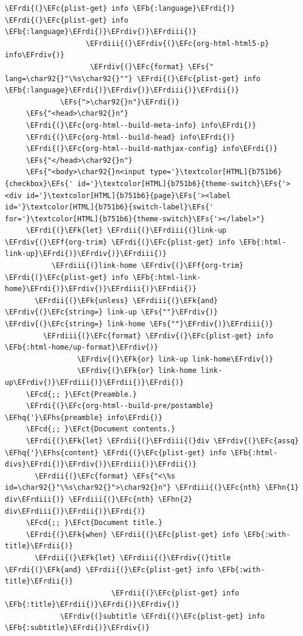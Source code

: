 \documentclass{scrartcl}
\newcommand{\EFk}[1]{\textcolor{EFk}{#1}} %
\newcommand{\EFs}[1]{\textcolor{EFs}{#1}} %
\newcommand{\EFb}[1]{\textcolor{EFb}{#1}} %
\newcommand{\EFct}[1]{\textcolor{EFct}{#1}} %
\newcommand{\EFc}[1]{\textcolor{EFc}{#1}} %
\newcommand{\EFf}[1]{\textcolor{EFf}{#1}} %
\newcommand{\EFcd}[1]{\textcolor{EFcd}{#1}} %
\newcommand{\EFhn}[1]{\textcolor{EFhn}{\textbf{#1}}} %
\newcommand{\EFhq}[1]{\textcolor{EFhq}{#1}} %
\newcommand{\EFhs}[1]{\textcolor{EFhs}{#1}} %
\newcommand{\EFrdi}[1]{\textcolor{EFrdi}{#1}} %
\newcommand{\EFrdii}[1]{\textcolor{EFrdii}{#1}} %
\newcommand{\EFrdiii}[1]{\textcolor{EFrdiii}{#1}} %
\newcommand{\EFrdiv}[1]{\textcolor{EFrdiv}{#1}} %
\begin{document}
\begin{Code}
\begin{Verbatim}[]
                     \EFrdi{(}\EFc{plist-get} info \EFb{:language}\EFrdi{)} \EFrdi{(}\EFc{plist-get} info \EFb{:language}\EFrdi{)}\EFrdiv{)}\EFrdiii{)}
                   \EFrdiii{(}\EFrdiv{(}\EFc{org-html-html5-p} info\EFrdiv{)}
                    \EFrdiv{(}\EFc{format} \EFs{" lang=\char92{}"\%s\char92{}""} \EFrdi{(}\EFc{plist-get} info \EFb{:language}\EFrdi{)}\EFrdiv{)}\EFrdiii{)}\EFrdii{)}
             \EFs{">\char92{}n"}\EFrdi{)}
     \EFs{"<head>\char92{}n"}
     \EFrdi{(}\EFc{org-html--build-meta-info} info\EFrdi{)}
     \EFrdi{(}\EFc{org-html--build-head} info\EFrdi{)}
     \EFrdi{(}\EFc{org-html--build-mathjax-config} info\EFrdi{)}
     \EFs{"</head>\char92{}n"}
     \EFs{"<body>\char92{}n<input type='}\textcolor[HTML]{b751b6}{checkbox}\EFs{' id='}\textcolor[HTML]{b751b6}{theme-switch}\EFs{'><div id='}\textcolor[HTML]{b751b6}{page}\EFs{'><label id='}\textcolor[HTML]{b751b6}{switch-label}\EFs{' for='}\textcolor[HTML]{b751b6}{theme-switch}\EFs{'></label>"}
     \EFrdi{(}\EFk{let} \EFrdii{(}\EFrdiii{(}link-up \EFrdiv{(}\EFf{org-trim} \EFrdi{(}\EFc{plist-get} info \EFb{:html-link-up}\EFrdi{)}\EFrdiv{)}\EFrdiii{)}
           \EFrdiii{(}link-home \EFrdiv{(}\EFf{org-trim} \EFrdi{(}\EFc{plist-get} info \EFb{:html-link-home}\EFrdi{)}\EFrdiv{)}\EFrdiii{)}\EFrdii{)}
       \EFrdii{(}\EFk{unless} \EFrdiii{(}\EFk{and} \EFrdiv{(}\EFc{string=} link-up \EFs{""}\EFrdiv{)} \EFrdiv{(}\EFc{string=} link-home \EFs{""}\EFrdiv{)}\EFrdiii{)}
         \EFrdiii{(}\EFc{format} \EFrdiv{(}\EFc{plist-get} info \EFb{:html-home/up-format}\EFrdiv{)}
                 \EFrdiv{(}\EFk{or} link-up link-home\EFrdiv{)}
                 \EFrdiv{(}\EFk{or} link-home link-up\EFrdiv{)}\EFrdiii{)}\EFrdii{)}\EFrdi{)}
     \EFcd{;; }\EFct{Preamble.}
     \EFrdi{(}\EFc{org-html--build-pre/postamble} \EFhq{'}\EFhs{preamble} info\EFrdi{)}
     \EFcd{;; }\EFct{Document contents.}
     \EFrdi{(}\EFk{let} \EFrdii{(}\EFrdiii{(}div \EFrdiv{(}\EFc{assq} \EFhq{'}\EFhs{content} \EFrdi{(}\EFc{plist-get} info \EFb{:html-divs}\EFrdi{)}\EFrdiv{)}\EFrdiii{)}\EFrdii{)}
       \EFrdii{(}\EFc{format} \EFs{"<\%s id=\char92{}"\%s\char92{}">\char92{}n"} \EFrdiii{(}\EFc{nth} \EFhn{1} div\EFrdiii{)} \EFrdiii{(}\EFc{nth} \EFhn{2} div\EFrdiii{)}\EFrdii{)}\EFrdi{)}
     \EFcd{;; }\EFct{Document title.}
     \EFrdi{(}\EFk{when} \EFrdii{(}\EFc{plist-get} info \EFb{:with-title}\EFrdii{)}
       \EFrdii{(}\EFk{let} \EFrdiii{(}\EFrdiv{(}title \EFrdi{(}\EFk{and} \EFrdii{(}\EFc{plist-get} info \EFb{:with-title}\EFrdii{)}
                         \EFrdii{(}\EFc{plist-get} info \EFb{:title}\EFrdii{)}\EFrdi{)}\EFrdiv{)}
             \EFrdiv{(}subtitle \EFrdi{(}\EFc{plist-get} info \EFb{:subtitle}\EFrdi{)}\EFrdiv{)}

\end{Verbatim}
\end{Code}
\end{document}
